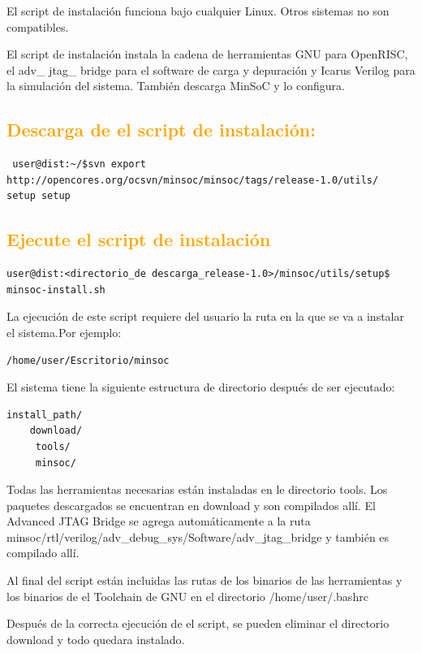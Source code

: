 \documentclass[a4paper,11pt]{article}
\begin{document}
El script de instalación funciona bajo cualquier Linux. Otros sistemas no son compatibles.

El script de instalación instala la cadena de herramientas GNU para OpenRISC, el adv\_ jtag\_ bridge para el software de carga y depuración y Icarus Verilog para la simulación del sistema. También descarga MinSoC y lo configura.
 

\subsection{\textcolor{orange}{Descarga de el script de instalación:}}

\begin{verbatim}
 user@dist:~/$svn export http://opencores.org/ocsvn/minsoc/minsoc/tags/release-1.0/utils/
setup setup
\end{verbatim}

\subsection{\textcolor{orange}{Ejecute el script de instalación}}

\begin{verbatim}
user@dist:<directorio_de descarga_release-1.0>/minsoc/utils/setup$ minsoc-install.sh
\end{verbatim}

La ejecución de este script requiere del usuario la ruta en la que se va a instalar el sistema.Por ejemplo:

\begin{verbatim}
/home/user/Escritorio/minsoc
\end{verbatim}

El sistema tiene la siguiente estructura de directorio después de ser ejecutado: 
\begin{verbatim}
install_path/
	download/
	 tools/
 	 minsoc/
\end{verbatim}

Todas las herramientas necesarias están instaladas en le directorio tools. Los paquetes descargados se encuentran en download y son compilados allí. El Advanced JTAG Bridge se agrega automáticamente a la ruta minsoc/rtl/verilog/adv\_debug\_sys/Software/adv\_jtag\_bridge  y también es compilado allí. 

Al final del script están incluidas las rutas de los binarios de las herramientas y los  binarios de el Toolchain de GNU en el directorio /home/user/.bashrc
 
Después de la correcta ejecución de el script, se pueden eliminar el directorio download y todo quedara instalado.
\end{document}
